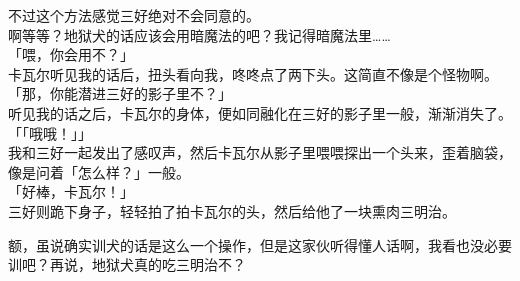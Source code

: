 不过这个方法感觉三好绝对不会同意的。\\

啊等等？地狱犬的话应该会用暗魔法的吧？我记得暗魔法里……\\

「喂，你会用不？」\\

卡瓦尔听见我的话后，扭头看向我，咚咚点了两下头。这简直不像是个怪物啊。\\

「那，你能潜进三好的影子里不？」\\

听见我的话之后，卡瓦尔的身体，便如同融化在三好的影子里一般，渐渐消失了。\\

「「哦哦！」」\\

我和三好一起发出了感叹声，然后卡瓦尔从影子里喂喂探出一个头来，歪着脑袋，像是问着「怎么样？」一般。\\

「好棒，卡瓦尔！」\\

三好则跪下身子，轻轻拍了拍卡瓦尔的头，然后给他了一块熏肉三明治。

额，虽说确实训犬的话是这么一个操作，但是这家伙听得懂人话啊，我看也没必要训吧？再说，地狱犬真的吃三明治不？

